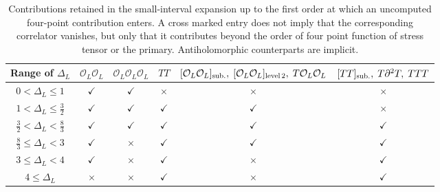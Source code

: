 \documentclass[11pt]{article}
\newcommand{\mO}{\mathcal{O}}
\begin{document}
\begin{table}[t]
\centering
\small
\renewcommand{\arraystretch}{1.35}
\begin{tabular}{c|c|c|c|c|c}
\hline\hline
Range of $\Delta_L$
&
$\mO_L\mO_L$
&
$\mO_L\mO_L\mO_L$
&
$TT$
&
$[\mO_L\mO_L]_{\rm sub.},\;[\mO_L\mO_L]_{\rm level\,2},\; T\mO_L\mO_L$
&
$[TT]_{\rm sub.},\; T\partial^2T,\; TTT$
\\
\hline

$0<\Delta_L\leq1$
&
$\checkmark$
&
$\checkmark$
& $\times$ 
& $\times$ 
&$\times$
\\

$1<\Delta_L\leq\frac{3}{2}$
&
$\checkmark$
&
$\checkmark$
&
$\checkmark$
&
$\checkmark$
& $\times$
\\

$\frac{3}{2}<\Delta_L<\frac{8}{3}$
&
$\checkmark$
&
$\checkmark$
&
$\checkmark$
&
$\checkmark$
&
$\checkmark$
\\


$\frac{8}{3}\leq\Delta_L<3$
&
$\checkmark$
& $\times $
&
$\checkmark$
&
$\checkmark$
&
$\checkmark$
\\

$3\leq\Delta_L<4$
&
$\checkmark$
& $\times$
&
$\checkmark$
&$\times$
&
$\checkmark$
\\

$ 4 \leq \Delta_L$
&$\times$
&$\times $
&
$\checkmark$
&$\times$
&
$\checkmark$
\\

\hline\hline
\end{tabular}
\caption{
Contributions retained in the small-interval expansion up to the
first order at which an uncomputed four-point contribution enters.
A cross marked entry does not imply that the corresponding correlator
vanishes, but only that it contributes beyond the order of four point function of stress tensor or the primary. Antiholomorphic counterparts
are implicit.
}
\label{tab:small-x-contributions}
\end{table}
\end{document}
